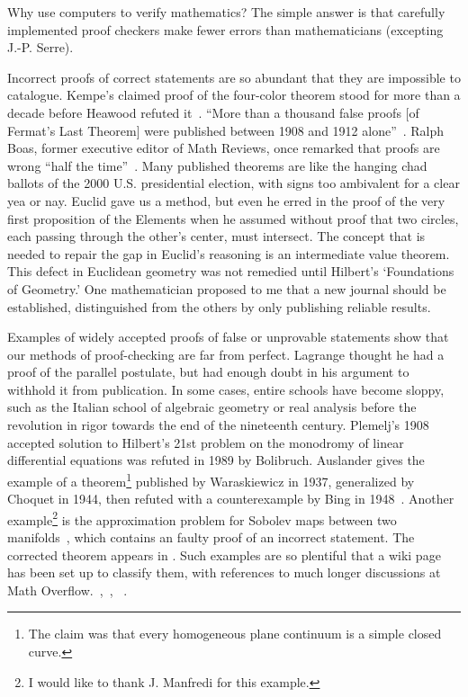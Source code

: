 \documentclass{llncs}
\begin{document}
Why use computers to verify mathematics?  The simple answer is that
carefully implemented proof checkers make fewer errors than 
mathematicians (excepting J.-P. Serre).

Incorrect proofs of correct statements are so abundant that they are
impossible to catalogue.  Kempe's claimed proof of the four-color
theorem stood for more than a decade before Heawood refuted
it~\cite[p.~115]{Mac}.  ``More than a thousand false proofs [of
Fermat's Last Theorem] were published between 1908 and 1912
alone''~\cite{Corry}.  Ralph Boas, former executive editor of Math
Reviews, once remarked that proofs are wrong ``half the
time''~\cite{Aus}.  Many published theorems are like the hanging chad
ballots of the 2000 U.S. presidential election, with signs too
ambivalent for a clear yea or nay.  Euclid gave us a method, but even
he erred in the proof of the very first proposition of the Elements
when he assumed without proof that two circles, each passing through
the other's center, must intersect.  The concept that is needed to
repair the gap in Euclid's reasoning is an intermediate value theorem.
This defect in Euclidean geometry was not remedied until Hilbert's
`Foundations of Geometry.'  One mathematician proposed to me that a
new journal should be established, distinguished from the others by
only publishing reliable results.


Examples of widely accepted proofs of false or unprovable statements
show that our methods of proof-checking are far from perfect.    Lagrange
thought he had a proof of the parallel postulate, but had enough doubt
in his argument to withhold it from publication.  In some cases,
entire schools have become sloppy, such as the Italian school of
algebraic geometry or real analysis before the revolution in rigor
towards the end of the nineteenth century.  Plemelj's 1908 accepted
solution to Hilbert's 21st problem on the monodromy of linear
differential equations was refuted in 1989 by Bolibruch.  Auslander
gives the example of a theorem\footnote{The claim was that every
  homogeneous plane continuum is a simple closed curve.}  published by
Waraskiewicz in 1937, generalized by Choquet in 1944, then refuted
with a counterexample by Bing in 1948~\cite{Aus}.  Another
example\footnote{I would like to thank J. Manfredi for this example.}
is the approximation problem for Sobolev maps between two
manifolds~\cite{Bethuel}, which contains an faulty proof of an
incorrect statement.  The corrected theorem appears in \cite{Hang}.
Such examples are so plentiful that a wiki
page has been set up to classify them, with references to much longer discussions
at Math Overflow.~\cite{XXWiki},~\cite{XXMO1}, ~\cite{XXMO2}.
\end{document}
